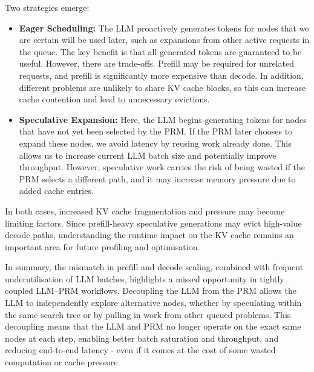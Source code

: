 \documentclass[11pt,twoside]{report}
\begin{document}
Two strategies emerge:
\begin{itemize}
  \item \textbf{Eager Scheduling:} The LLM proactively generates tokens for nodes that we are certain will be used later, such as expansions from other active requests in the queue. 
    The key benefit is that all generated tokens are guaranteed to be useful. 
    However, there are trade-offs. 
    Prefill may be required for unrelated requests, and prefill is significantly more expensive than decode. 
    In addition, different problems are unlikely to share KV cache blocks, so this can increase cache contention and lead to unnecessary evictions.
  \item \textbf{Speculative Expansion:} Here, the LLM begins generating tokens for nodes that have not yet been selected by the PRM. 
    If the PRM later chooses to expand these nodes, we avoid latency by reusing work already done. 
    This allows us to increase current LLM batch size and potentially improve throughput. 
    However, speculative work carries the risk of being wasted if the PRM selects a different path, and it may increase memory pressure due to added cache entries.
\end{itemize}

In both cases, increased KV cache fragmentation and pressure may become limiting factors. 
Since prefill-heavy speculative generations may evict high-value decode paths, understanding the runtime impact on the KV cache remains an important area for future profiling and optimisation.

In summary, the mismatch in prefill and decode scaling, combined with frequent underutilisation of LLM batches, highlights a missed opportunity in tightly coupled LLM–PRM workflows. 
Decoupling the LLM from the PRM allows the LLM to independently explore alternative nodes, whether by speculating within the same search tree or by pulling in work from other queued problems. 
This decoupling means that the LLM and PRM no longer operate on the exact same nodes at each step, enabling better batch saturation and throughput, and reducing end-to-end latency - even if it comes at the cost of some wasted computation or cache pressure.
\end{document}
